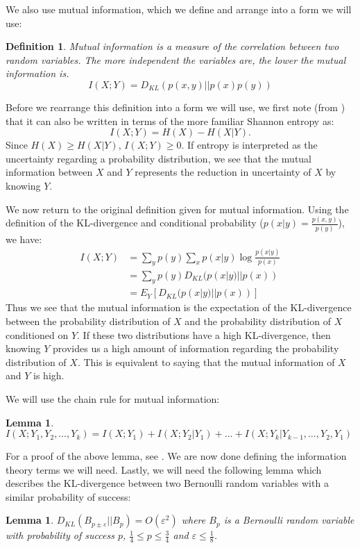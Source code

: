 \documentclass[12pt]{article}
\newtheorem{mydef}[theorem]{Definition}
\newtheorem{lemma}[theorem]{Lemma}
\begin{document}
We also use mutual information, which we define and arrange into a form we will use:
\begin{mydef}
Mutual information is a measure of the correlation between two random variables. The more independent the variables are, the lower the mutual information is. 
$$I(X;Y) = D_{KL}(p(x,y)||p(x)p(y))$$
\end{mydef}

Before we rearrange this definition into a form we will use, we first note (from \cite{Cover}) that it can also be written in terms of the more familiar Shannon entropy as:
$$I(X;Y) = H(X) - H(X|Y).$$
Since $H(X) \geq H(X|Y)$, $I(X;Y) \geq 0$. If entropy is interpreted as the uncertainty regarding a probability distribution, we see that the mutual information between $X$ and $Y$ represents the reduction in uncertainty of $X$ by knowing $Y$. 

We now return to the original definition given for mutual information. Using the definition of the KL-divergence and conditional probability ($p(x|y) = \frac{p(x,y)}{p(y)}$), we have: 
\begin{align*}
I(X;Y) &= \sum_y p(y) \sum_x p(x|y)\log{\frac{p(x|y)}{p(x)}} \\
       &= \sum_y p(y) D_{KL}(p(x|y)||p(x)) \\
       &= E_Y [D_{KL}(p(x|y)||p(x))]
\end{align*}
Thus we see that the mutual information  is the expectation of the KL-divergence between the probability distribution of $X$ and the probability distribution of $X$ conditioned on $Y$. If these two distributions have a high KL-divergence, then knowing $Y$ provides us a high amount of information regarding the probability distribution of $X$. This is equivalent to saying that the mutual information of $X$ and $Y$ is high.

We will use the chain rule for mutual information: 
\begin{lemma} \label{lem:mutinfochain}
$I(X;Y_1, Y_2, \ldots, Y_k) = I(X;Y_1) + I(X;Y_2|Y_1) + \ldots + I(X;Y_k|Y_{k-1}, \ldots, Y_2, Y_1)$
\end{lemma}

For a proof of the above lemma, see \cite{Cover}. We are now done defining the information theory terms we will need. Lastly, we will need the following lemma which describes the KL-divergence between two Bernoulli random variables with a similar probability of success:
\begin{lemma} \label{lem:berndiv}
$D_{KL}(B_{p \pm \varepsilon}||B_p) = O(\varepsilon^2)$ where $B_p$ is a Bernoulli random variable with probability of success $p$, $\frac{1}{4} \leq p \leq \frac{3}{4}$ and $\varepsilon \leq \frac{1}{8}$.
\end{lemma}
\end{document}
